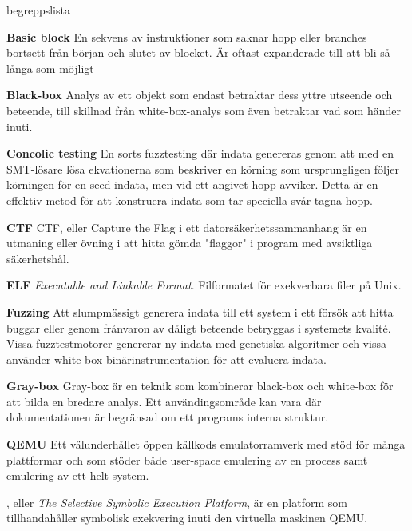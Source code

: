 \begin{labeling}{begreppslista}

  \item[\textbf{Basic block}] En sekvens av instruktioner som saknar
      hopp eller branches bortsett från början och slutet av
      blocket. Är oftast expanderade till att bli så långa som möjligt

  \item [\textbf{Black-box}] Analys av ett objekt som endast betraktar dess
      yttre utseende och beteende, till skillnad från white-box-analys som även
      betraktar vad som händer inuti.

  \item [\textbf{Concolic testing}] En sorts fuzztesting där indata genereras
      genom att med en SMT-lösare lösa ekvationerna som beskriver en körning som
      ursprungligen följer körningen för en seed-indata, men vid ett angivet
      hopp avviker. Detta är en effektiv metod för att konstruera indata som tar
      speciella svår-tagna hopp.

  \item [\textbf{CTF}] CTF, eller Capture the Flag i ett
    datorsäkerhetssammanhang är en utmaning eller övning i
    att hitta gömda "flaggor" i program med avsiktliga säkerhetshål.

  \item [\textbf{ELF}] \emph{Executable and Linkable Format}. Filformatet för
      exekverbara filer på Unix.

  \item [\textbf{Fuzzing}] Att slumpmässigt generera indata till ett system i
      ett försök att hitta buggar eller genom frånvaron av dåligt beteende
      betryggas i systemets kvalité. Vissa fuzztestmotorer genererar ny indata
      med genetiska algoritmer och vissa använder white-box binärinstrumentation
      för att evaluera indata.

  \item [\textbf{Gray-box}] Gray-box är en teknik som kombinerar black-box och
  white-box för att bilda en bredare analys. Ett användingsområde kan vara där 
  dokumentationen är begränsad om ett programs interna struktur.

  \item [\textbf{QEMU}] Ett välunderhållet öppen källkods emulatorramverk med stöd
    för många plattformar och som stöder både user-space emulering av en process
    samt emulering av ett helt system.

  \item [\textbf{\stoe}] \stoe, eller \emph{The Selective Symbolic Execution Platform}, är
      en platform som tillhandahåller symbolisk exekvering inuti den virtuella
      maskinen QEMU.


\end{labeling}
